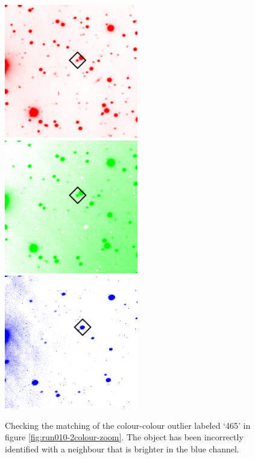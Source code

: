 \begin{figure}
  \centering
  \includegraphics[width=.30\linewidth]{images/mismatch-run010_r.png}
  \includegraphics[width=.30\linewidth]{images/mismatch-run010_g.png}
  \includegraphics[width=.30\linewidth]{images/mismatch-run010_b.png}
  \caption{Checking the matching of the colour-colour outlier labeled `465' in figure \ref{fig:run010-2colour-zoom}. The object has been incorrectly identified with a neighbour that is brighter in the blue channel.}
\label{fig:comparewebmismatch}
\end{figure}


